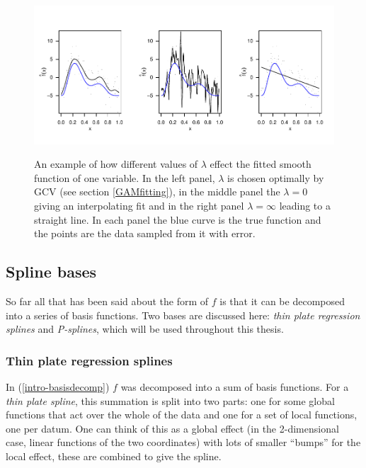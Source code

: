 \begin{figure}[tb]
\centering
\includegraphics[width=6in]{intro/figs/lambda-ex.pdf}\\
\caption{An example of how different values of $\lambda$ effect the fitted smooth function of one variable. In the left panel, $\lambda$ is chosen optimally by GCV (see section \ref{GAMfitting}), in the middle panel the $\lambda=0$ giving an interpolating fit and in the right panel $\lambda=\infty$ leading to a straight line. In each panel the blue curve is the true function and the points are the data sampled from it with error.}
\label{lambda-ex}
\end{figure}


\subsection{Spline bases}

So far all that has been said about the form of $f$ is that it can be decomposed into a series of basis functions. Two bases are discussed here: \textit{thin plate regression splines} and \textit{P-splines}, which will be used throughout this thesis.

\subsubsection{Thin plate regression splines}
\label{GAMtprs}
\label{GAMtprspenalty}

In (\ref{intro-basisdecomp}) $f$ was decomposed into a sum of basis functions. For a \textit{thin plate spline}, this summation is split into two parts: one for some global functions that act over the whole of the data and one for a set of local functions, one per datum. One can think of this as a global effect (in the 2-dimensional case, linear functions of the two coordinates) with lots of smaller ``bumps'' for the local effect, these are combined to give the spline.

